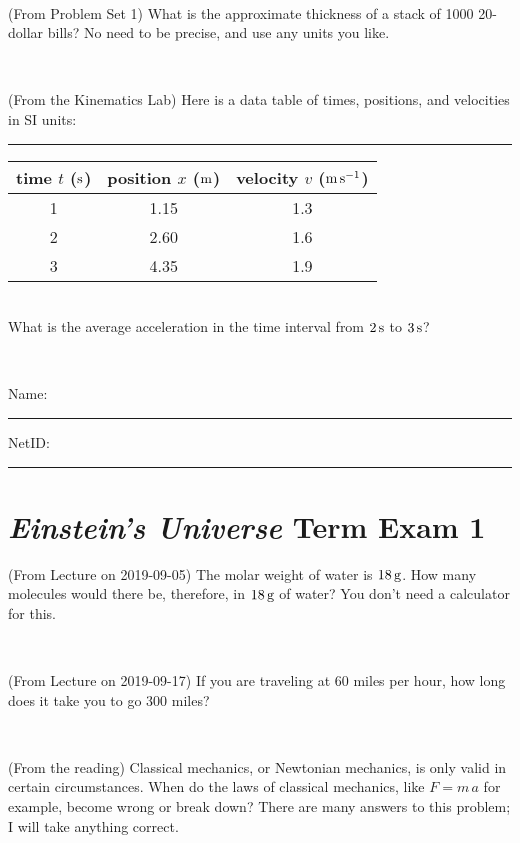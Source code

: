 \documentclass[12pt, letterpaper]{article}
\begin{document}
\vfill ~

\begin{problem} (From Problem Set 1)
What is the approximate thickness of a stack of 1000 20-dollar bills?
No need to be precise, and use any units you like.
\end{problem}


\vfill ~

\begin{problem} (From the Kinematics Lab)
Here is a data table of times, positions, and velocities in SI units:\\
\rule{1.0in}{0pt}\begin{tabular}{c|c|c}
time $t$ ($\mathrm{s}$) & position $x$ ($\mathrm{m}$) & velocity $v$ ($\mathrm{m}\,\mathrm{s}^{-1}$) \\
\hline
1 & 1.15 & 1.3 \\
2 & 2.60 & 1.6 \\
3 & 4.35 & 1.9 \\
\hline
\end{tabular}\\
What is the average acceleration in the time interval from $2\,\mathrm{s}$ to $3\,\mathrm{s}$?
\end{problem}


\vfill ~


\cleardoublepage



\noindent
Name: \rule[-1ex]{0.60\textwidth}{0.1pt}
NetID: \rule[-1ex]{0.20\textwidth}{0.1pt}

\section*{\textsl{Einstein's Universe} Term Exam 1}
\setcounter{problem}{1}


\begin{problem} (From Lecture on 2019-09-05)
The molar weight of water is $18\,\mathrm{g}$. How many molecules would there
be, therefore, in $18\,\mathrm{g}$ of water? You don't need a calculator for
this.
\end{problem}


\vfill ~

\begin{problem} (From Lecture on 2019-09-17)
If you are traveling at 60 miles per hour, how long does
it take you to go 300 miles?
\end{problem}


\vfill ~

\begin{problem} (From the reading)
Classical mechanics, or Newtonian mechanics, is only valid in certain
circumstances. When do the laws of classical mechanics, like $F =
m\,a$ for example, become wrong or break down? There are many answers
to this problem; I will take anything correct.
\end{problem}
\end{document}
